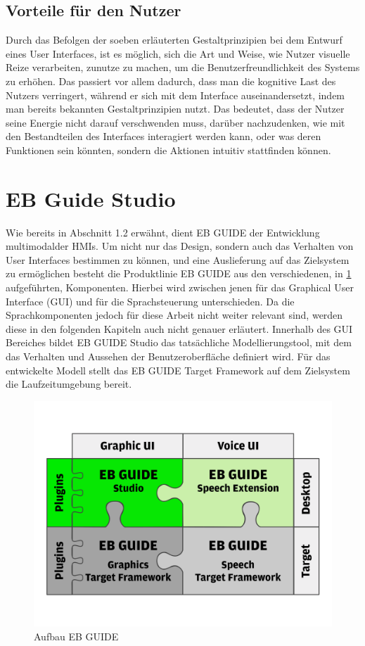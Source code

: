\subsection*{Vorteile für den Nutzer}
Durch das Befolgen der soeben erläuterten Gestaltprinzipien bei dem Entwurf eines User Interfaces, ist es möglich, sich die Art und Weise, wie Nutzer visuelle Reize verarbeiten, zunutze zu machen, um die Benutzerfreundlichkeit des Systems zu erhöhen.
Das passiert vor allem dadurch, dass man die kognitive Last des Nutzers verringert, während er sich mit dem Interface auseinandersetzt, indem man bereits bekannten Gestaltprinzipien nutzt.
Das bedeutet, dass der Nutzer seine Energie nicht darauf verschwenden muss, darüber nachzudenken, wie mit den Bestandteilen des Interfaces interagiert werden kann, oder was deren Funktionen sein könnten, sondern die Aktionen intuitiv stattfinden können\cite{Knight.2019c}.

\section{EB Guide Studio}
Wie bereits in Abschnitt 1.2 erwähnt, dient EB GUIDE der Entwicklung multimodalder HMIs.
Um nicht nur das Design, sondern auch das Verhalten von User Interfaces bestimmen zu können, und eine Auslieferung auf das Zielsystem zu ermöglichen besteht die Produktlinie EB GUIDE aus den verschiedenen, in \cref{fig:guide_puzzle} aufgeführten, Komponenten.
Hierbei wird zwischen jenen für das Graphical User Interface (GUI) und  für die Sprachsteuerung unterschieden.
Da die Sprachkomponenten jedoch für diese Arbeit nicht weiter relevant sind, werden diese in den folgenden Kapiteln auch nicht genauer erläutert.
Innerhalb des GUI Bereiches bildet EB GUIDE Studio das tatsächliche Modellierungstool, mit dem das Verhalten und Aussehen der Benutzeroberfläche definiert wird.
Für das entwickelte Modell stellt das EB GUIDE Target Framework auf dem Zielsystem die Laufzeitumgebung bereit.\cite{.c}

\begin{figure} [H]
\begin{center}
  \includegraphics[scale=0.6]{figures/EB_GUIDE_Puzzle.png}
  \caption{Aufbau EB GUIDE}
  \label{fig:guide_puzzle}
\end{center}
\end{figure}

